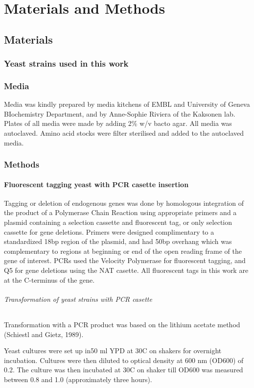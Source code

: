 \chapter{Materials and Methods} %

\section{Materials} 
\subsection{Yeast strains used in this work}

\subsection{Media}
Media was kindly prepared by media kitchens of EMBL and University of Geneva BIochemistry Department, and by Anne-Sophie Riviera of the Kaksonen lab. Plates of all media were made by adding 2\% w/v bacto agar.
All media was autoclaved. Amino acid stocks were filter sterilised and added to the autoclaved media.


\subsection{Methods}
\subsubsection{Fluorescent tagging yeast with PCR casette insertion}
Tagging or deletion of endogenous genes was done by homologous integration of the product of a Polymerase Chain Reaction using appropriate primers and a plasmid containing a selection cassette and fluorescent tag, or only selection cassette for gene deletions. Primers were designed complimentary to a standardized 18bp region of the plasmid, and had 50bp overhang which was complementary to regions at beginning or end of the open reading frame of the gene of interest. PCRs used the Velocity Polymerase for fluorescent tagging, and Q5 for gene deletions using the NAT casette. 
All fluorescent tags in this work are at the C-terminus of the gene.

\subparagraph{Transformation of yeast strains with PCR casette}

Transformation with a PCR product was based on the lithium acetate method (Schiestl and Gietz, 1989).

Yeast cultures were set up in50 ml YPD at 30C on shakers for overnight incubation. Cultures were then diluted to optical density at 600 nm (OD600) of 0.2. The culture was then incubated at 30C on shaker till OD600 was measured between 0.8 and 1.0 (approximately three hours).

